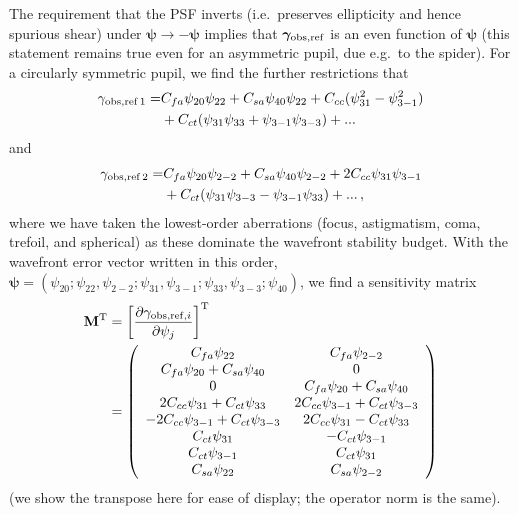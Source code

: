 \documentclass[usenatbib]{mnras}
\begin{document}
The requirement that the PSF inverts (i.e.\ preserves ellipticity and
hence spurious shear) under
${\boldsymbol\psi}\rightarrow-{\boldsymbol\psi}$ implies that
${\boldsymbol\gamma}_{\rm obs,ref}$ is an even function of
${\boldsymbol\psi}$ (this statement remains true even for an
asymmetric pupil, due e.g.\ to the spider). For a circularly symmetric
pupil, we find the further restrictions that
\begin{align}
\gamma_{\rm obs,ref\,1} =& C_{fa} \psi_{20} \psi_{22} + C_{sa} \psi_{40} \psi_{22}
+ C_{cc} (\psi_{31}^2-\psi_{3-1}^2) \nonumber\\
&+ C_{ct} (\psi_{31}\psi_{33} + \psi_{3-1}\psi_{3-3})
+ ... \label{eq:temp.314159}
\end{align}
and
\begin{align}
\gamma_{\rm obs,ref\,2} =& C_{fa} \psi_{20} \psi_{2-2} + C_{sa} \psi_{40} \psi_{2-2}
+ 2C_{cc} \psi_{31} \psi_{3-1} \nonumber\\
&+ C_{ct} (\psi_{31}\psi_{3-3} - \psi_{3-1}\psi_{33})
+ ...\,,
\end{align}
where we have taken the lowest-order aberrations (focus, astigmatism,
coma, trefoil, and spherical) as these dominate the wavefront
stability budget. With the wavefront error vector written in this
order, ${\boldsymbol\psi} = (\psi_{20}; \psi_{22},\psi_{2-2};
\psi_{31},\psi_{3-1}; \psi_{33},\psi_{3-3}; \psi_{40})$, we find a
sensitivity matrix
\begin{align}
{\bf M}^{\rm T} &= \left[ \frac{\partial \gamma_{{\rm obs,ref},i}}{\partial\psi_j} \right]^{\rm T}\nonumber\\
&= \left( \begin{array}{cc}
C_{fa}\psi_{22}  & C_{fa}\psi_{2-2} \\
C_{fa}\psi_{20}+C_{sa}\psi_{40} & 0 \\
0 & C_{fa}\psi_{20}+C_{sa}\psi_{40} \\
2C_{cc}\psi_{31}+C_{ct}\psi_{33} & 2C_{cc}\psi_{3-1}+C_{ct}\psi_{3-3} \\
-2C_{cc}\psi_{3-1}+C_{ct}\psi_{3-3} & 2C_{cc}\psi_{31}-C_{ct}\psi_{33} \\
C_{ct}\psi_{31} & -C_{ct}\psi_{3-1} \\
C_{ct}\psi_{3-1} & C_{ct}\psi_{31} \\
C_{sa}\psi_{22} & C_{sa}\psi_{2-2}
\end{array} \right)
\label{eq:TheMatrix}
\end{align}
(we show the transpose here for ease of display; the operator norm is the same).
\end{document}
